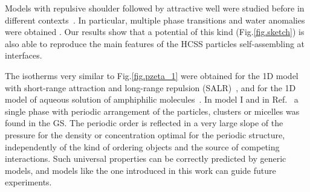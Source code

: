 \documentclass[preprint,
prl,%
aps]{revtex4}
\begin{document}
 Models with repulsive shoulder followed by attractive well 
 were studied before in different contexts~\cite{hemmer:70:0,kincaid:76:0,oliveira:06:0,lomba:07:0}.
  In particular, multiple phase transitions\cite{hemmer:70:0,kincaid:76:0} and water
  anomalies were obtained \cite{oliveira:06:0,lomba:07:0}. 
  Our results show that  a potential of this kind
  (Fig.\ref{fig.sketch})
  is also able to reproduce the main features of the HCSS particles self-assembling at interfaces. 
  
The isotherms  very similar to Fig.\ref{fig.pzeta_1} were obtained for
  the 1D  model  with short-range attraction and long-range repulsion (SALR)~\cite{pekalski:13:0}, 
  and for the  1D model of aqueous solution of 
  amphiphilic molecules~\cite{pekalski:14:1}.
  In  model I and in Ref.~\cite{pekalski:13:0,pekalski:14:1} a single phase with periodic arrangement 
  of the particles, clusters or micelles was found in the GS. The periodic order 
 is reflected in a very large slope of the 
pressure for the density or concentration optimal for the periodic 
structure, 
independently of the kind of ordering objects and the source of competing interactions.   
 Such universal properties can be correctly predicted by generic models,  and models like the one introduced in this work can
guide future experiments.
\end{document}
